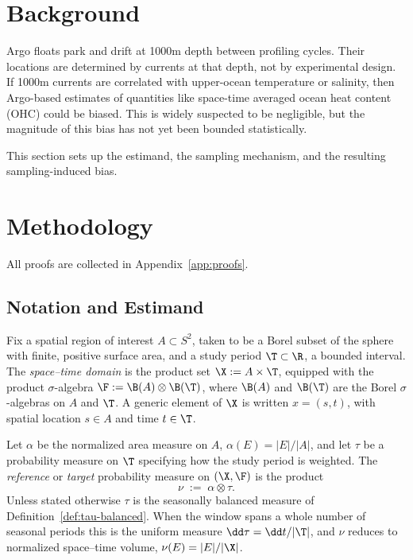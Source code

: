\section{Background}
\label{sec:background}

Argo floats park and drift at 1000m depth between profiling cycles.
Their locations are determined by currents at that depth, not by experimental design.
If 1000m currents are correlated with upper-ocean temperature or salinity, then Argo-based estimates of quantities like space-time averaged ocean heat content (OHC) could be biased.
This is widely suspected to be negligible, but the magnitude of this bias has not yet been bounded statistically.

This section sets up the estimand, the sampling mechanism, and the resulting sampling-induced bias.

\section{Methodology}
\label{sec:methodology}

All proofs are collected in Appendix~\ref{app:proofs}.

\subsection{Notation and Estimand}
\label{sec:def}

\begin{definition}
\label{def:domain}
Fix a spatial region of interest $A \subset S^{2}$, taken to be a Borel subset of the sphere with finite, positive surface area, and a study period $\T \subset \R$, a bounded interval.
The \emph{space--time domain} is the product set
$\X := A \times \T$, equipped with the product $\sigma$-algebra
$\F := \B(A)\otimes\B(\T)$, where $\B(A)$ and $\B(\T)$ are the Borel
$\sigma$-algebras on $A$ and $\T$. A generic element of $\X$ is written
$x = (s,t)$, with spatial location $s \in A$ and time $t \in \T$.
\end{definition}

\begin{definition}
\label{def:nu}
Let $\alpha$ be the normalized area measure on $A$, $\alpha(E)=|E|/|A|$,
and let $\tau$ be a probability measure on $\T$ specifying how the study
period is weighted. The \emph{reference} or \emph{target} probability
measure on $(\X,\F)$ is the product
\[
  \nu \;:=\; \alpha\otimes\tau .
\]
Unless stated otherwise $\tau$ is the seasonally balanced measure of
Definition~\ref{def:tau-balanced}. When the window spans a whole number
of seasonal periods this is the uniform measure $\dd\tau=\dd t/|\T|$, and
$\nu$ reduces to normalized space--time volume, $\nu(E)=|E|/|\X|$.
\end{definition}

